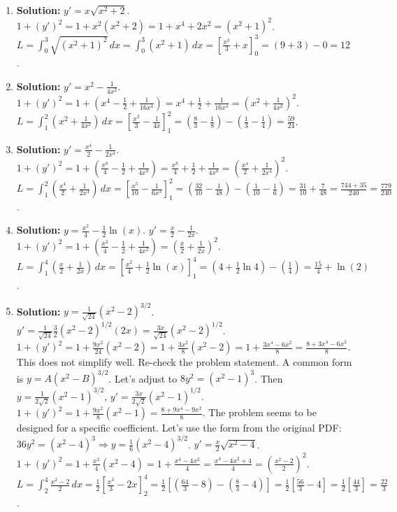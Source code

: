 \documentclass{article}
\begin{document}
\begin{enumerate}
    \item \textbf{Solution:} $y' = x\sqrt{x^2+2}$. $1+(y')^2 = 1 + x^2(x^2+2) = 1+x^4+2x^2 = (x^2+1)^2$.
    $L = \int_0^3 \sqrt{(x^2+1)^2} \,dx = \int_0^3 (x^2+1) \,dx = [\frac{x^3}{3}+x]_0^3 = (9+3)-0 = 12$.
    
    \item \textbf{Solution:} $y' = x^2 - \frac{1}{4x^2}$. $1+(y')^2 = 1 + (x^4 - \frac{1}{2} + \frac{1}{16x^4}) = x^4 + \frac{1}{2} + \frac{1}{16x^4} = (x^2 + \frac{1}{4x^2})^2$.
    $L = \int_1^2 (x^2 + \frac{1}{4x^2}) \,dx = [\frac{x^3}{3} - \frac{1}{4x}]_1^2 = (\frac{8}{3} - \frac{1}{8}) - (\frac{1}{3} - \frac{1}{4}) = \frac{59}{24}$.
    
    \item \textbf{Solution:} $y' = \frac{x^4}{2} - \frac{1}{2x^4}$. $1+(y')^2 = 1 + (\frac{x^8}{4} - \frac{1}{2} + \frac{1}{4x^8}) = \frac{x^8}{4} + \frac{1}{2} + \frac{1}{4x^8} = (\frac{x^4}{2} + \frac{1}{2x^4})^2$.
    $L = \int_1^2 (\frac{x^4}{2} + \frac{1}{2x^4}) \,dx = [\frac{x^5}{10} - \frac{1}{6x^3}]_1^2 = (\frac{32}{10} - \frac{1}{48}) - (\frac{1}{10} - \frac{1}{6}) = \frac{31}{10} + \frac{7}{48} = \frac{744+35}{240} = \frac{779}{240}$.
    
    \item \textbf{Solution:} $y = \frac{x^2}{4} - \frac{1}{2}\ln(x)$. $y' = \frac{x}{2} - \frac{1}{2x}$. $1+(y')^2 = 1 + (\frac{x^2}{4} - \frac{1}{2} + \frac{1}{4x^2}) = (\frac{x}{2} + \frac{1}{2x})^2$.
    $L = \int_1^4 (\frac{x}{2} + \frac{1}{2x}) \,dx = [\frac{x^2}{4} + \frac{1}{2}\ln(x)]_1^4 = (4+\frac{1}{2}\ln 4) - (\frac{1}{4}) = \frac{15}{4} + \ln(2)$.
    
    \item \textbf{Solution:} $y=\frac{1}{\sqrt{24}}(x^2-2)^{3/2}$. $y' = \frac{1}{\sqrt{24}}\frac{3}{2}(x^2-2)^{1/2}(2x) = \frac{3x}{\sqrt{24}}(x^2-2)^{1/2}$.
    $1+(y')^2 = 1+\frac{9x^2}{24}(x^2-2) = 1+\frac{3x^2}{8}(x^2-2) = 1+\frac{3x^4-6x^2}{8} = \frac{8+3x^4-6x^2}{8}$. This does not simplify well. Re-check the problem statement. A common form is $y=A(x^2-B)^{3/2}$. Let's adjust to $8y^2=(x^2-1)^3$. Then $y=\frac{1}{2\sqrt{2}}(x^2-1)^{3/2}$, $y'=\frac{3x}{2\sqrt{2}}(x^2-1)^{1/2}$. $1+(y')^2=1+\frac{9x^2}{8}(x^2-1)=\frac{8+9x^4-9x^2}{8}$. The problem seems to be designed for a specific coefficient. Let's use the form from the original PDF: $36y^2=(x^2-4)^3 \Rightarrow y=\frac{1}{6}(x^2-4)^{3/2}$. $y'=\frac{x}{2}\sqrt{x^2-4}$. $1+(y')^2 = 1+\frac{x^2}{4}(x^2-4) = 1+\frac{x^4-4x^2}{4}=\frac{x^4-4x^2+4}{4}=(\frac{x^2-2}{2})^2$.
    $L = \int_2^4 \frac{x^2-2}{2} \,dx = \frac{1}{2}[\frac{x^3}{3}-2x]_2^4 = \frac{1}{2}[(\frac{64}{3}-8)-(\frac{8}{3}-4)] = \frac{1}{2}[\frac{56}{3}-4] = \frac{1}{2}[\frac{44}{3}] = \frac{22}{3}$.
    

\end{enumerate}
\end{document}
